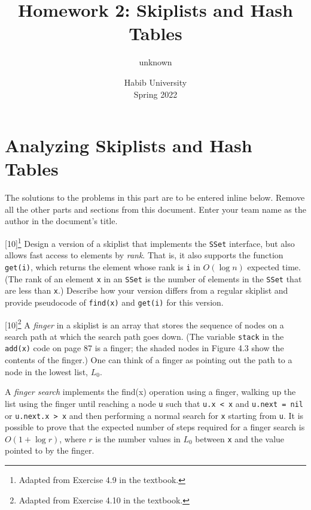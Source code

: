 \documentclass[addpoints]{exam}
\title{Homework 2: Skiplists and Hash Tables}
\author{unknown}  %
\date{Habib University\\Spring 2022}
\begin{document}
\maketitle
\part{Analyzing Skiplists and Hash Tables}

The solutions to the problems in this part are to be entered inline below. Remove all the other parts and sections from this document. Enter your team name as the author in the document's title.

\begin{questions}

[10]\footnote{Adapted from Exercise 4.9 in the textbook.}
  Design a version of a skiplist that implements the \texttt{SSet} interface, but also allows fast access to elements by \textit{rank}. That is, it also supports the function \texttt{get(i)}, which returns the element whose rank is \texttt{i} in $O(\log n)$ expected time. (The rank of an element \texttt{x} in an \texttt{SSet} is the number of elements in the \texttt{SSet} that are less than \texttt{x}.)
  Describe how your version differs from a regular skiplist and provide pseudocode of \texttt{find(x)} and \texttt{get(i)} for this version.
  \begin{solution}
  \end{solution}

[10]\footnote{Adapted from Exercise 4.10 in the textbook.}
  A \textit{finger} in a skiplist is an array that stores the sequence of nodes on a search path at which the search path goes down. (The variable \texttt{stack} in the \texttt{add(x)} code on page 87 is a finger; the shaded nodes in Figure 4.3 show the contents of the finger.) One can think of a finger as pointing out the path to a node in the lowest list, $L_0$.
  
  A \textit{finger search} implements the find(x) operation using a finger, walking up the list using the finger until reaching a node \texttt{u} such that \texttt{u.x < x} and \texttt{u.next = nil} or \texttt{u.next.x > x} and then performing a normal search for \texttt{x} starting from \texttt{u}. It is possible to prove that the expected number of steps required for a finger search is $O(1+\log r)$, where $r$ is the number values in $L_0$ between \texttt{x} and the value pointed to by the finger.


\end{questions}
\end{document}
